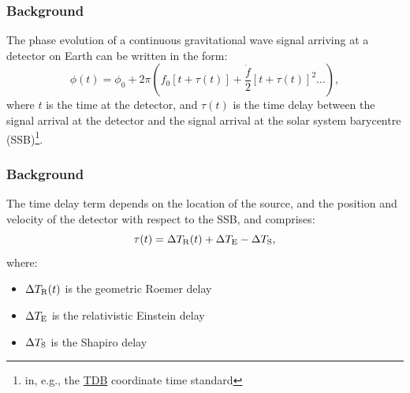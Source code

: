 
\def\mytitle{Reduced Order Modelling for Solar System Barycentring}
\def\mydate{12 July 2017}
\def\myauthor{Matthew Pitkin}
\def\affiliation{University of Glasgow}
\def\latexxslt{beamer}
\def\latexmode{beamer}
\def\theme{m}
\def\event{LIGO-G1701327}



%


\begin{frame}

\frametitle{Background}
\label{background}

The phase evolution of a continuous gravitational wave signal arriving at a detector on
Earth can be written in the form:
\[
\phi(t) = \phi_0 + 2\pi \left(f_0\left[t+\tau(t)\right] + \frac{\dot{f}}{2}\left[t + \tau(t)\right]^2 \ldots \right),
\]
where $t$ is the time at the detector, and $\tau(t)$ is the time delay between the signal arrival
at the detector and the signal arrival at the solar system barycentre (SSB)\footnote{in, e.g., the  \href{https://en.wikipedia.org/wiki/Barycentric_Dynamical_Time}{TDB} coordinate time standard}.

\end{frame}

\begin{frame}

\frametitle{Background}
\label{background}

The time delay term depends on the location of the source, and the position and velocity of the detector with
respect to the SSB, and comprises:
\[
\tau(t) = \Delta T_{\rm R}(t) + \Delta T_{\rm E} - \Delta T_{\rm S}, 
\]
where:

\begin{itemize}
\item $\Delta T_{\rm R}(t)$ is the geometric Roemer delay

\item $\Delta T_{\rm E}$ is the relativistic Einstein delay

\item $\Delta T_{\rm S}$ is the Shapiro delay

\end{itemize}

\end{frame}

